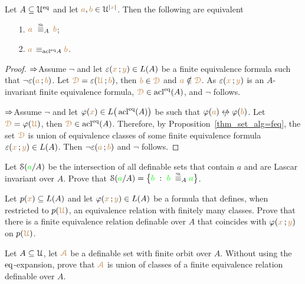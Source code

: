 \documentclass[creche.tex]{subfiles}
\begin{document}
\begin{proposition}\label{prop_Shelah_strong_types}
Let $A\subseteq\EuScript U^{{\rm eq}}$ and let ${\color{brown} a},{\color{brown} b}\in\EuScript U^{|{\color{brown} x}|}$. Then the following are equivalent\nobreak
\begin{itemize}
\item[1.]  ${\mr a}\ \equivSh_A\, {\mr b}$;
\item[2.]  ${\color{brown} a}\,\equiv_{\mathop{\rm acl}^{{\rm eq}}\! A}{\color{brown} b}$.
\end{itemize} 
\end{proposition}
\begin{proof}
$\Rightarrow$\quad Assume $\neg$ and let $\varepsilon({\color{brown} x}\,;{\color{brown} y})\in L(A)$ be a finite equivalence formula such that $\neg\varepsilon({\color{brown} a}\,;{\color{brown} b})$. Let ${\color{brown}\EuScript D}=\varepsilon({\color{brown}\EuScript U}\,;{\color{brown} b})$, then  ${\color{brown} b}\in{\color{brown}\EuScript D}$ and ${\color{brown} a}\notin{\color{brown}\EuScript D}$. As $\varepsilon({\color{brown} x}\,;{\color{brown} y})$ is an $A$-invariant finite equivalence formula, ${\color{brown}\EuScript D}\in\mathop{\rm acl}^{{\rm eq}}(A)$, and $\neg$ follows. 

$\Rightarrow$\quad Assume $\neg$ and let $\varphi({\color{brown} x})\in L\big(\mathop{\rm acl}^{{\rm eq}}(A)\big)$ be  such that $\phi({\mr a})\niff\phi({\mr b})$. Let ${\color{brown}\EuScript D}=\varphi({\color{brown}\EuScript U})$, then ${\color{brown}\EuScript D}\in\mathop{\rm acl}^{{\rm eq}}(A)$. Therefore, by Proposition~\ref{thm_set_alg=feq}, the set ${\color{brown}\EuScript D}$ is union of equivalence classes of some finite equivalence formula $\varepsilon({\color{brown} x}\,;{\color{brown} y})\in L(A)$. Then $\neg\varepsilon({\color{brown} a}\,;{\color{brown} b})$ and $\neg$ follows.
\end{proof}


\begin{exercise}
Let $\EuScript S({\color{green} a}/A)$ be the intersection of all definable sets that contain $a$ and are Lascar invariant over $A$. Prove that $\S({\gr a}/A)=\big\{{\gr b}\ :\ {\gr b}\;\equivSh_A {\gr a}\big\}$.\QED
\end{exercise}



\begin{exercise}
Let $p({\color{brown} x})\subseteq L(A)$ and let $\varphi({\color{brown} x}\,;{\color{brown} y})\in L(A)$ be a formula that defines, when restricted to $p({\color{brown}\EuScript U})$, an equivalence relation with finitely many classes. Prove that there is a finite equivalence relation definable over $A$ that coincides with $\varphi({\color{brown} x}\,;{\color{brown} y})$ on $p({\color{brown}\EuScript U})$.\QED
\end{exercise}

\begin{exercise}\label{ex_feqthm_senza_eq}
Let $A\subseteq\EuScript U$, let ${\color{brown}\EuScript A}$ be a definable set with finite orbit over $A$. Without using the ${{\rm eq}}$-expansion, prove that ${\color{brown}\EuScript A}$ is union of classes of a finite equivalence relation definable over $A$.\QED
\end{exercise}
\end{document}
